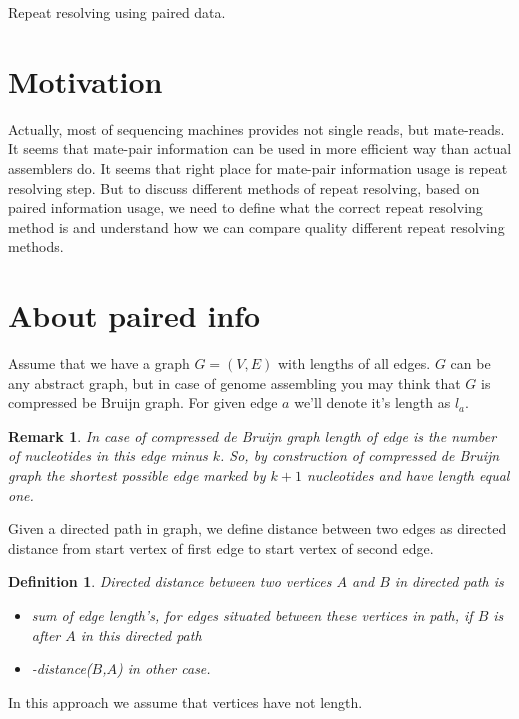 \documentclass[12pt,a4paper,oneside]{article}
\newtheorem{definition}{Definition}
\newtheorem{remark}{Remark}
\begin{document}


\begin{center}
Repeat resolving using paired data.
\end{center}
\begin{abstract}
 In this paper we give a general definition for validness of repeat resolving methods based on paired information usage. We prove that rectangle graph technique is a honest repeat resolving method in case of error-free data and provide some ideas how to improve rectangle graph approach, and how can inexact mate-read gaps be overcame.
\end{abstract}

\section{Motivation}
Actually, most of sequencing machines provides not single reads, but mate-reads. It seems that mate-pair information can be used in more efficient way than actual assemblers do. It seems that right place for mate-pair information usage is repeat resolving step.
But to discuss different methods of repeat resolving, based on paired information usage, we need to define what the correct repeat resolving method is and understand how we can compare quality different repeat resolving methods. 

\section{About paired info}

Assume that we have a graph $G=(V,E)$ with lengths of all edges. $G$ can be any abstract graph, but in case of genome assembling you may think that $G$ is compressed be Bruijn graph. 
For given edge $a$ we'll denote it's length as $l_a$. 
\begin{remark}
In case of compressed de Bruijn graph length of edge is the number of nucleotides in this edge minus $k$. So, by construction of compressed de Bruijn graph the shortest possible edge marked by $k+1$ nucleotides and have length equal one. 
\end{remark}
Given a directed path in graph, we define distance between two edges as directed distance from start vertex of first edge to start vertex of second edge.
\begin{definition}
 Directed distance between two vertices $A$ and $B$ in directed path is 
\begin{itemize}
\item
  sum of edge length's, for edges situated between these vertices in path, if $B$ is after $A$ in this directed path
\item
  -distance($B$,$A$) in other case.
\end{itemize}
\end{definition}
In this approach we assume that vertices have not length.
\end{document}
